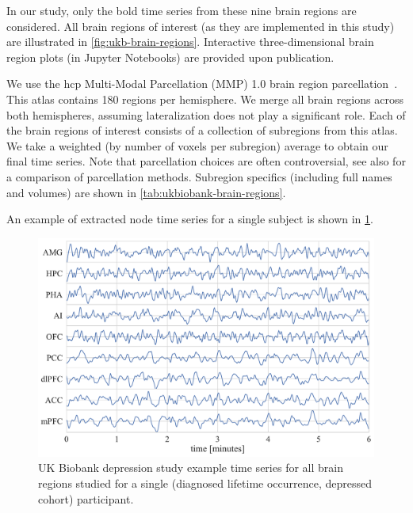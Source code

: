 In our study, only the \gls{bold} time series from these nine brain regions are considered.
All brain regions of interest (as they are implemented in this study) are illustrated in \cref{fig:ukb-brain-regions}.
Interactive three-dimensional brain region plots (in Jupyter Notebooks) are provided upon publication.

We use the \gls{hcp} Multi-Modal Parcellation (MMP) 1.0 brain region parcellation~\parencite{Glasser2016}.
This atlas contains 180 regions per hemisphere.
We merge all brain regions across both hemispheres, assuming lateralization does not play a significant role.
Each of the brain regions of interest consists of a collection of subregions from this atlas.
We take a weighted (by number of voxels per subregion) average to obtain our final time series.
Note that parcellation choices are often controversial, see also \textcite{Arslan2018, Bryce2021} for a comparison of parcellation methods.
Subregion specifics (including full names and volumes) are shown in \cref{tab:ukbiobank-brain-regions}.



An example of extracted node time series for a single subject is shown in \cref{fig:ukb-example-time-series}.


\begin{figure}[t]
  \centering
  \includegraphics[width=\textwidth]{fig/ukbiobank/node_timeseries/diagnosed_lifetime_occurrence/depressed/time_series_regions_of_interest}
  \caption{
    UK Biobank depression study example time series for all brain regions studied for a single (diagnosed lifetime occurrence, depressed cohort) participant.
  }\label{fig:ukb-example-time-series}
\end{figure}


